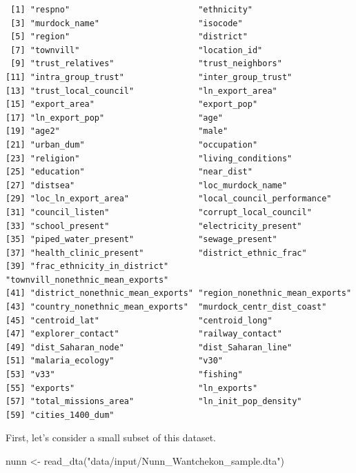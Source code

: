 \documentclass[
  letterpaper,
]{book}
\newenvironment{Shaded}{\begin{snugshade}}{\end{snugshade}}
\newcommand{\FunctionTok}[1]{\textcolor[rgb]{0.28,0.35,0.67}{#1}}
\newcommand{\NormalTok}[1]{\textcolor[rgb]{0.00,0.23,0.31}{#1}}
\newcommand{\OtherTok}[1]{\textcolor[rgb]{0.00,0.23,0.31}{#1}}
\newcommand{\StringTok}[1]{\textcolor[rgb]{0.13,0.47,0.30}{#1}}
\theoremstyle{definition}
\theoremstyle{definition}
\theoremstyle{plain}
\theoremstyle{definition}
\theoremstyle{plain}
\theoremstyle{plain}
\theoremstyle{remark}
\begin{document}
\begin{verbatim}
 [1] "respno"                          "ethnicity"                      
 [3] "murdock_name"                    "isocode"                        
 [5] "region"                          "district"                       
 [7] "townvill"                        "location_id"                    
 [9] "trust_relatives"                 "trust_neighbors"                
[11] "intra_group_trust"               "inter_group_trust"              
[13] "trust_local_council"             "ln_export_area"                 
[15] "export_area"                     "export_pop"                     
[17] "ln_export_pop"                   "age"                            
[19] "age2"                            "male"                           
[21] "urban_dum"                       "occupation"                     
[23] "religion"                        "living_conditions"              
[25] "education"                       "near_dist"                      
[27] "distsea"                         "loc_murdock_name"               
[29] "loc_ln_export_area"              "local_council_performance"      
[31] "council_listen"                  "corrupt_local_council"          
[33] "school_present"                  "electricity_present"            
[35] "piped_water_present"             "sewage_present"                 
[37] "health_clinic_present"           "district_ethnic_frac"           
[39] "frac_ethnicity_in_district"      "townvill_nonethnic_mean_exports"
[41] "district_nonethnic_mean_exports" "region_nonethnic_mean_exports"  
[43] "country_nonethnic_mean_exports"  "murdock_centr_dist_coast"       
[45] "centroid_lat"                    "centroid_long"                  
[47] "explorer_contact"                "railway_contact"                
[49] "dist_Saharan_node"               "dist_Saharan_line"              
[51] "malaria_ecology"                 "v30"                            
[53] "v33"                             "fishing"                        
[55] "exports"                         "ln_exports"                     
[57] "total_missions_area"             "ln_init_pop_density"            
[59] "cities_1400_dum"                
\end{verbatim}

First, let's consider a small subset of this dataset.

\begin{Shaded}
\begin{Highlighting}[]
\NormalTok{nunn }\OtherTok{\textless{}{-}} \FunctionTok{read\_dta}\NormalTok{(}\StringTok{"data/input/Nunn\_Wantchekon\_sample.dta"}\NormalTok{)}
\end{Highlighting}
\end{Shaded}
\end{document}
